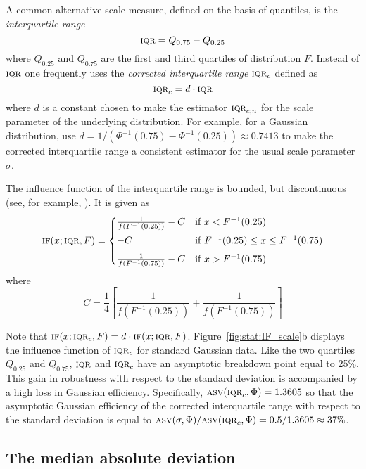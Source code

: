 A common alternative scale measure, defined on the basis of quantiles, is the
\emph{interquartile range}
\[
    \stsc{IQR}= Q_{0.75} - Q_{0.25}
\]
where $Q_{0.25}$ and $Q_{0.75}$ are the first and third quartiles of
distribution $F$. Instead of $\stsc{IQR}$ one frequently uses the
\emph{corrected interquartile range} $\stsc{IQR}_c$ defined as
\[
    \stsc{IQR}_c = d \cdot \stsc{IQR}
\]
where $d$ is a constant chosen to make the estimator $\stsc{IQR}_{c;n}$
 for the scale parameter of the
underlying distribution. For example, for a Gaussian distribution, use $d =
1 / \left(\Phi^{-1}(0.75) - \Phi^{-1}(0.25)\right) \approx 0.7413$ to make the
corrected interquartile range a consistent estimator for the usual scale
parameter $\sigma$.

The influence function of the interquartile range is bounded, but discontinuous
(see, for example, \citealp[p. 35–36]{wilcox:2005}). It is given as
\[
    \stsc{IF}(x; \stsc{IQR}, F) =
    \begin{cases}
        \frac{1}{f\left(F^{-1}(0.25)\right)} - C & \text{if $x < F^{-1}(0.25)$}\\[1ex]
        -C                                       & \text{if $F^{-1}(0.25) \leq x \leq F^{-1}(0.75)$}\\[1ex]
        \frac{1}{f\left(F^{-1}(0.75)\right)} - C & \text{if $x > F^{-1}(0.75)$}
    \end{cases}
\]
where 
\[
    C = \frac{1}{4} \left[\frac{1}{f\left(F^{-1}(0.25)\right)} + \frac{1}{f\left(F^{-1}(0.75)\right)}\right]
\]

Note that $\stsc{IF}(x; \stsc{IQR}_c, F) = d \cdot \stsc{IF}(x;
\stsc{IQR}, F)$. Figure~\ref{fig:stat:IF_scale}b displays the influence
function of $\stsc{IQR}_c$ for standard Gaussian data. Like the two quartiles
$Q_{0.25}$ and $Q_{0.75}$, $\stsc{IQR}$ and $\stsc{IQR}_c$ have an
asymptotic breakdown point equal to 25\%. This gain in robustness with respect
to the standard deviation is accompanied by a high loss in Gaussian
efficiency. Specifically, $\stsc{ASV}(\stsc{IQR}_c, \Phi) = 1.3605$ so that      
the asymptotic Gaussian efficiency of the corrected interquartile range with
respect to the standard deviation is equal to $\stsc{ASV}(\sigma, \Phi) /
\stsc{ASV}(\stsc{IQR}_c, \Phi) = 0.5/1.3605 \approx 37\%$.


\subsection{The median absolute deviation}

